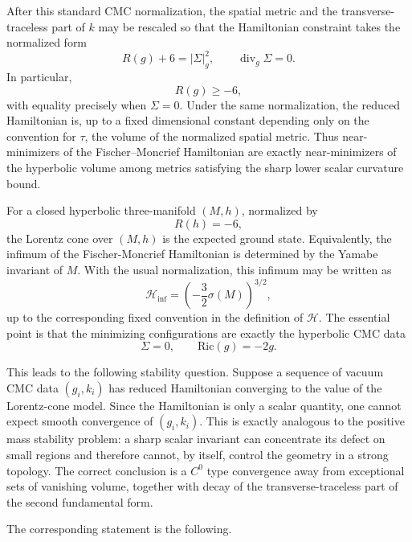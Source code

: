\documentclass{amsart}
\begin{document}
\noindent After this standard CMC normalization, the spatial metric and the transverse-
traceless part of \(k\) may be rescaled so that the Hamiltonian constraint takes
the normalized form
\begin{equation}
\label{eq:normalized-HC}
        R(g)+6=|\Sigma|_g^2,
        \qquad
        \operatorname{div}_g\Sigma=0.
\end{equation}
In particular,
\[
        R(g)\geq -6,
\]
with equality precisely when \(\Sigma=0\).  Under the same normalization, the
reduced Hamiltonian is, up to a fixed dimensional constant depending only on
the convention for \(\tau\), the volume of the normalized spatial metric.  Thus
near-minimizers of the Fischer--Moncrief Hamiltonian \cite{fischer2000reduced,fischer2001reduced} are exactly near-minimizers
of the hyperbolic volume among metrics satisfying the sharp lower scalar
curvature bound.

\noindent For a closed hyperbolic three-manifold \((M,h)\), normalized by
\[
        R(h)=-6,
\]
the Lorentz cone over \((M,h)\) is the expected ground state.  Equivalently, the
infimum of the Fischer-Moncrief Hamiltonian \cite{fischer2000reduced,fischer2001reduced} is determined by the Yamabe
invariant of \(M\).  With the usual normalization, this infimum may be written
as
\[
        \mathcal H_{\inf}
        =
        \left(-\frac{3}{2}\sigma(M)\right)^{3/2},
\]
up to the corresponding fixed convention in the definition of
\(\mathcal H\).  The essential point is that the minimizing configurations are
exactly the hyperbolic CMC data
\[
        \Sigma=0,
        \qquad
        \text{Ric}(g)=-2g.
\]


\noindent This leads to the following stability question.  Suppose a sequence of vacuum
CMC data \((g_i,k_i)\) has reduced Hamiltonian converging to the value of the
Lorentz-cone model.  Since the Hamiltonian is only a scalar quantity, one cannot
expect smooth convergence of \((g_i,k_i)\).  This is exactly analogous to the
positive mass stability problem: a sharp scalar invariant can concentrate its
defect on small regions and therefore cannot, by itself, control the geometry
in a strong topology.  The correct conclusion is a $C^{0}$
type convergence away from exceptional sets of vanishing volume, together with decay of the transverse-traceless part of the
second fundamental form.

\noindent The corresponding statement is the following.
\end{document}
